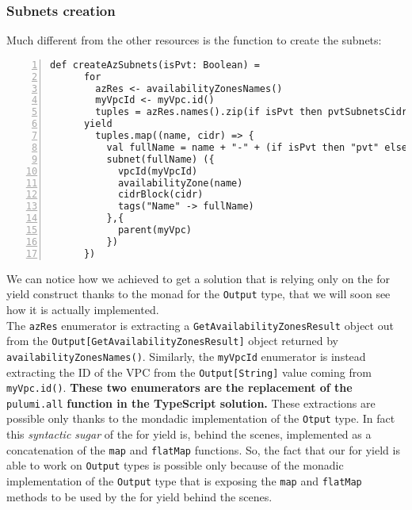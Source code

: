 \subsubsection{Subnets creation}
\label{sssec:subnets-creation}
Much different from the other resources is the function to create the subnets:\\
\begin{minipage}{\linewidth}
\begin{lstlisting}[numbers=left, numberstyle=\tiny, numbersep=-5pt, stepnumber=1,linewidth=420pt]
  def createAzSubnets(isPvt: Boolean) =
      for
        azRes <- availabilityZonesNames()
        myVpcId <- myVpc.id()
        tuples = azRes.names().zip(if isPvt then pvtSubnetsCidrs else pubSubnetsCidrs)
      yield
        tuples.map((name, cidr) => {
          val fullName = name + "-" + (if isPvt then "pvt" else "pub") + "-subnet-scala"
          subnet(fullName) ({
            vpcId(myVpcId)
            availabilityZone(name)
            cidrBlock(cidr)
            tags("Name" -> fullName)
          },{
            parent(myVpc)
          })
      })
\end{lstlisting}
\end{minipage}
We can notice how we achieved to get a solution that is relying only on the for yield construct thanks to the monad for the \texttt{Output} type, that we will soon see how it is actually implemented.\\
The \texttt{azRes} enumerator is extracting a \texttt{GetAvailabilityZonesResult} object out from the \texttt{Output[GetAvailabilityZonesResult]} object returned by \texttt{availabilityZonesNames()}. 
Similarly, the \texttt{myVpcId} enumerator is instead extracting the ID of the VPC from the \texttt{Output[String]} value coming from \texttt{myVpc.id()}.
\textbf{These two enumerators are the replacement of the} \texttt{pulumi.all} \textbf{function in the TypeScript solution.}
These extractions are possible only thanks to the mondadic implementation of the \texttt{Otput} type. 
In fact this \textit{syntactic sugar} of the for yield is, behind the scenes, implemented as a concatenation of the \texttt{map} and \texttt{flatMap} functions.
So, the fact that our for yield is able to work on \texttt{Output} types is possible only because of the monadic implementation of the \texttt{Output} type that is exposing the \texttt{map} and \texttt{flatMap} methods to be used by the for yield behind the scenes.\\
